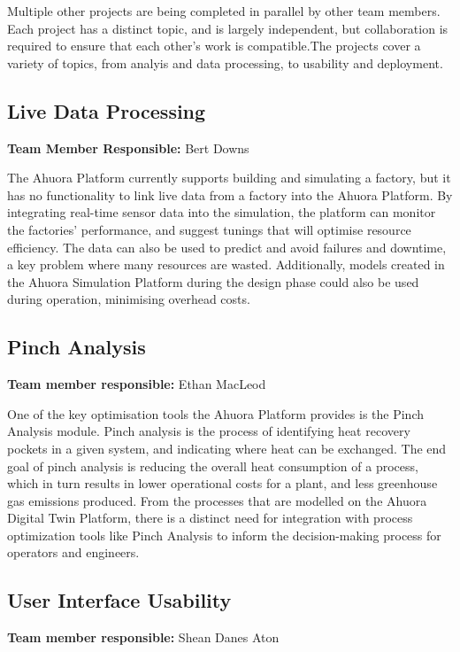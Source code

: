 Multiple other projects are being completed in parallel by other team members. Each project has a distinct topic, and is largely independent, but collaboration is required to ensure that each other's work is compatible.The projects cover a variety of topics, from analyis and data processing, to usability and deployment.

\subsection{Live Data Processing}

\textbf{Team Member Responsible:} Bert Downs

The Ahuora Platform currently supports building and simulating a factory, but it has no functionality to link live data from a factory into the Ahuora Platform. By integrating real-time sensor data into the simulation, the platform can monitor the factories' performance, and suggest tunings that will optimise resource efficiency. The data can also be used to predict and avoid failures and downtime, a key problem where many resources are wasted. Additionally, models created in the Ahuora Simulation Platform during the design phase could also be used during operation, minimising overhead costs.

\subsection{Pinch Analysis}

\textbf{Team member responsible:} Ethan MacLeod

One of the key optimisation tools the Ahuora Platform provides is the Pinch Analysis module. Pinch analysis is the process of identifying heat recovery pockets in a given system, and indicating where heat can be exchanged. The end goal of pinch analysis is reducing the overall heat consumption of a process, which in turn results in lower operational costs for a plant, and less greenhouse gas emissions produced. From the processes that are modelled on the Ahuora Digital Twin Platform, there is a distinct need for integration with process optimization tools like Pinch Analysis to inform the decision-making process for operators and engineers.

\subsection{User Interface Usability}

\textbf{Team member responsible:} Shean Danes Aton

